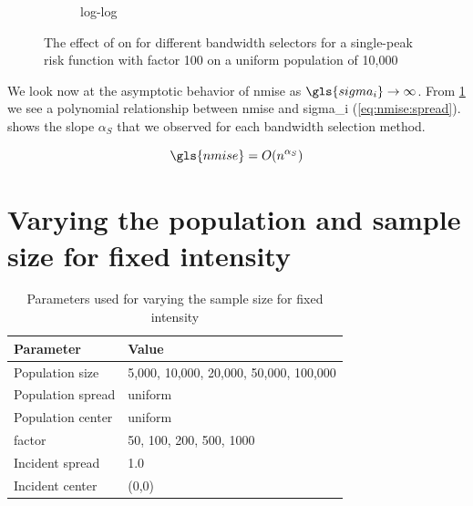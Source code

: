 \begin{figure}[htbp]
\begin{subfigure}[t]{0.24\textwidth}
        \caption{ log-log}
        \label{fig:ise:unif_Spreads_1h:nmise_log_log}
    \end{subfigure}
    \caption[: by risk ]
        {The effect of  on  for different bandwidth selectors for a single-peak risk function with \gls{factor} 100 on a uniform population of 10,000}
    \label{fig:ise:unif_Spreads_1h}
\end{figure}

We look now at the asymptotic behavior of \gls{nmise} as $\gls{sigma_i} \to \infty$.
From \cref{fig:ise:unif_Spreads_1h:nmise_log_log} we see a polynomial relationship between \gls{nmise} and \gls{sigma_i} (\cref{eq:nmise:spread}).
 shows the slope $\alpha_S$ that we observed for each bandwidth selection method.

\begin{equation}
    \label{eq:nmise:spread}
    \gls{nmise} = O(n^{\alpha_S})
\end{equation}


\section{Varying the population and sample size for fixed intensity}
\label{sec:results:unifNpop_1h}

\begin{table}[htbp]
    \centering
    \begin{tabular}{ll}
        \toprule
        Parameter & Value \\
        \midrule
        Population size & 5,000, 10,000, 20,000, 50,000, 100,000 \\
        Population \gls{spread} & uniform \\
        Population center & uniform \\
        \Gls{factor} & 50, 100, 200, 500, 1000 \\
        Incident \gls{spread} & 1.0 \\
        Incident center & (0,0) \\
        \bottomrule
    \end{tabular}
    \caption{Parameters used for varying the sample size for fixed intensity}
    \label{tab:params:unifNpop_1h}
\end{table}

